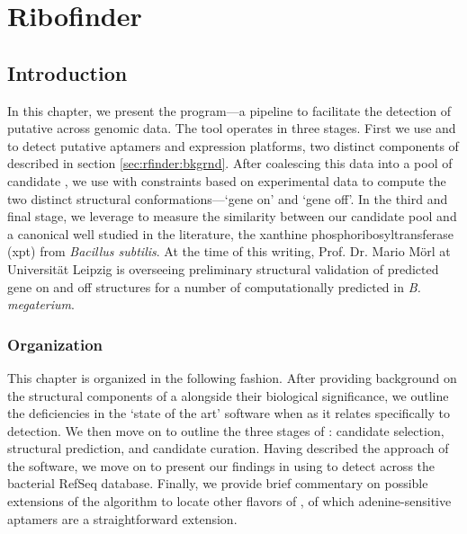 
\newcommand{\fnaRetrievalTime}{\formatdate{25}{11}{2014} at \formattime{9}{14}{0}}

\chapter{Ribofinder}
\label{ch:rfinder}


\section{Introduction}
\label{sec:rfinder:intro}

In this chapter, we present the \rfinder program---a pipeline to facilitate the
detection of putative \grbs across genomic data. The \rfinder
tool operates in three stages. First we use \infernal \cite{infernal} and \tthp \cite{ermolaeva:2000cl} to detect
putative aptamers and expression platforms, two distinct components of
\rbs described in section \ref{sec:rfinder:bkgrnd}. After coalescing
this data into a pool of candidate \rbs, we use \rfold \cite{lorenz.amb11} with constraints
based on experimental data to compute the two distinct structural
conformations---`gene on' and `gene off'. In the third and final stage, we
leverage \foldalign \cite{havgaard:2007ca} to measure the similarity between our candidate pool and a
canonical \grb well studied in the literature, the
xanthine phosphoribosyltransferase (xpt) \grb from {\em Bacillus subtilis}. At the time
of this writing, Prof. Dr. Mario
M\"orl at Universit\"at Leipzig is overseeing preliminary structural
validation of predicted gene on and off structures for a number of
computationally predicted \grbs in {\em B. megaterium}.

\subsection{Organization}
\label{subsec:rfinder:org}

This chapter is organized in the following fashion. After providing background
on the structural components of a \rb alongside their biological
significance, we outline the deficiencies in the `state of the art' software
when as it relates specifically to \rb detection. We then move on to outline
the three stages of \rfinder: candidate selection, structural prediction, and
candidate curation. Having described the approach of the software, we move on
to present our findings in using \rfinder to detect \grbs across
the bacterial RefSeq database. Finally, we provide brief commentary on possible
extensions of the algorithm to locate other flavors of \rbs, of which
adenine-sensitive aptamers are a straightforward extension.

